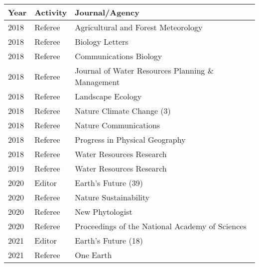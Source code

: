 
\begin{longtable}{llp{12cm}}
Year & Activity & Journal/Agency\\
\hline 
\endhead 
2018 & Referee & Agricultural and Forest Meteorology  \\
2018 & Referee & Biology Letters  \\
2018 & Referee & Communications Biology  \\
2018 & Referee & Journal of Water Resources Planning \& Management  \\
2018 & Referee & Landscape Ecology  \\
2018 & Referee & Nature Climate Change  (3)  \\
2018 & Referee & Nature Communications  \\
2018 & Referee & Progress in Physical Geography  \\
2018 & Referee & Water Resources Research  \\
2019 & Referee & Water Resources Research  \\
2020 & Editor & Earth's Future  (39)  \\
2020 & Referee & Nature Sustainability  \\
2020 & Referee & New Phytologist  \\
2020 & Referee & Proceedings of the National Academy of Sciences  \\
2021 & Editor & Earth's Future  (18)  \\
2021 & Referee & One Earth  \\
\end{longtable}

